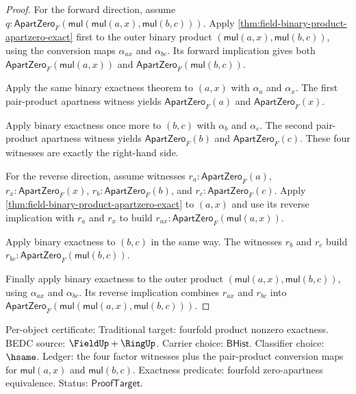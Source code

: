 \begin{proof}
For the forward direction, assume
$q:\mathsf{ApartZero}_F(\mathsf{mul}(\mathsf{mul}(a,x),\mathsf{mul}(b,c)))$.
Apply \autoref{thm:field-binary-product-apartzero-exact} first to the outer
binary product $(\mathsf{mul}(a,x),\mathsf{mul}(b,c))$, using the conversion
maps $\alpha_{ax}$ and $\alpha_{bc}$. Its forward implication gives both
$\mathsf{ApartZero}_F(\mathsf{mul}(a,x))$ and
$\mathsf{ApartZero}_F(\mathsf{mul}(b,c))$.

Apply the same binary exactness theorem to $(a,x)$ with $\alpha_a$ and
$\alpha_x$. The first pair-product apartness witness yields
$\mathsf{ApartZero}_F(a)$ and $\mathsf{ApartZero}_F(x)$.

Apply binary exactness once more to $(b,c)$ with $\alpha_b$ and $\alpha_c$.
The second pair-product apartness witness yields $\mathsf{ApartZero}_F(b)$
and $\mathsf{ApartZero}_F(c)$. These four witnesses are exactly the
right-hand side.

For the reverse direction, assume witnesses
$r_a:\mathsf{ApartZero}_F(a)$, $r_x:\mathsf{ApartZero}_F(x)$,
$r_b:\mathsf{ApartZero}_F(b)$, and $r_c:\mathsf{ApartZero}_F(c)$. Apply
\autoref{thm:field-binary-product-apartzero-exact} to $(a,x)$ and use its
reverse implication with $r_a$ and $r_x$ to build
$r_{ax}:\mathsf{ApartZero}_F(\mathsf{mul}(a,x))$.

Apply binary exactness to $(b,c)$ in the same way. The witnesses $r_b$ and
$r_c$ build $r_{bc}:\mathsf{ApartZero}_F(\mathsf{mul}(b,c))$.

Finally apply binary exactness to the outer product
$(\mathsf{mul}(a,x),\mathsf{mul}(b,c))$, using $\alpha_{ax}$ and
$\alpha_{bc}$. Its reverse implication combines $r_{ax}$ and $r_{bc}$ into
$\mathsf{ApartZero}_F(\mathsf{mul}(\mathsf{mul}(a,x),\mathsf{mul}(b,c)))$.
\end{proof}

Per-object certificate: Traditional target: fourfold product nonzero
exactness. BEDC source: $\FieldUp+\RingUp$. Carrier choice:
$\mathsf{BHist}$. Classifier choice: $\hsame$. Ledger: the four factor
witnesses plus the pair-product conversion maps for $\mathsf{mul}(a,x)$ and
$\mathsf{mul}(b,c)$. Exactness predicate: fourfold zero-apartness
equivalence. Status: $\mathsf{ProofTarget}$.

